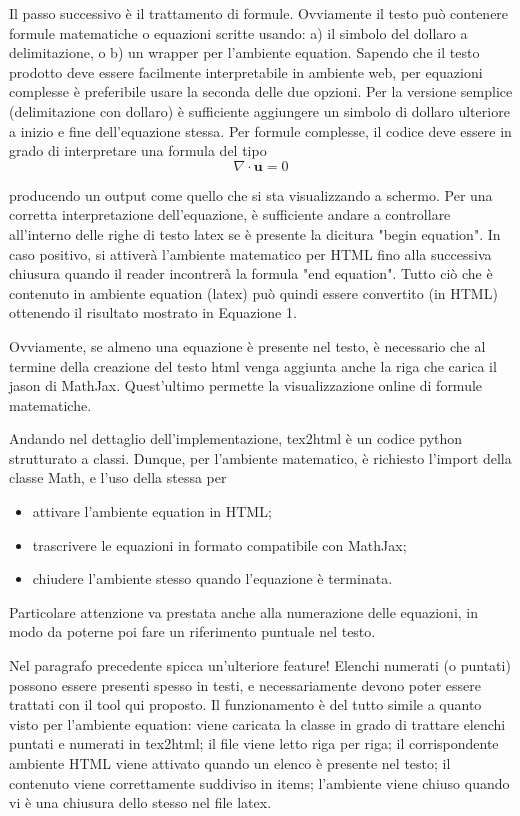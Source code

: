 Il passo successivo è il trattamento di formule. Ovviamente il testo può contenere formule matematiche o equazioni scritte usando: a) il simbolo del dollaro a delimitazione, o b) un wrapper per l'ambiente equation. Sapendo che il testo prodotto deve essere facilmente interpretabile in ambiente web, per equazioni complesse è preferibile usare la seconda delle due opzioni. Per la versione semplice (delimitazione con dollaro) è sufficiente aggiungere un simbolo di dollaro ulteriore a inizio e fine dell'equazione stessa. Per formule complesse, il codice deve essere in grado di interpretare una formula del tipo
\begin{equation}
\nabla \cdot \mathbf{u} = 0
\end{equation}

producendo un output come quello che si sta visualizzando a schermo. Per una corretta interpretazione dell'equazione, è sufficiente andare a controllare all'interno delle righe di testo latex se è presente la dicitura "begin equation". In caso positivo, si attiverà l'ambiente matematico per HTML fino alla successiva chiusura quando il reader incontrerà la formula "end equation". Tutto ciò che è contenuto in ambiente equation (latex) può quindi essere convertito (in HTML) ottenendo il risultato mostrato in Equazione 1. 

Ovviamente, se almeno una equazione è presente nel testo, è necessario che al termine della creazione del testo html venga aggiunta anche la riga che carica il jason di MathJax. Quest'ultimo permette la visualizzazione online di formule matematiche. 

Andando nel dettaglio dell'implementazione, tex2html è un codice python strutturato a classi. Dunque, per l'ambiente matematico, è richiesto l'import della classe Math, e l'uso della stessa per
\begin{itemize}
\item attivare l'ambiente equation in HTML; 
\item trascrivere le equazioni in formato compatibile con MathJax; 
\item chiudere l'ambiente stesso quando l'equazione è terminata. 
\end{itemize}

Particolare attenzione va prestata anche alla numerazione delle equazioni, in modo da poterne poi fare un riferimento puntuale nel testo. 

Nel paragrafo precedente spicca un'ulteriore feature! Elenchi numerati (o puntati) possono essere presenti spesso in testi, e necessariamente devono poter essere trattati con il tool qui proposto. Il funzionamento è del tutto simile a quanto visto per l'ambiente equation: viene caricata la classe in grado di trattare elenchi puntati e numerati in tex2html; il file viene letto riga per riga; il corrispondente ambiente HTML viene attivato quando un elenco è presente nel testo; il contenuto viene correttamente suddiviso in items; l'ambiente viene chiuso quando vi è una chiusura dello stesso nel file latex. 


